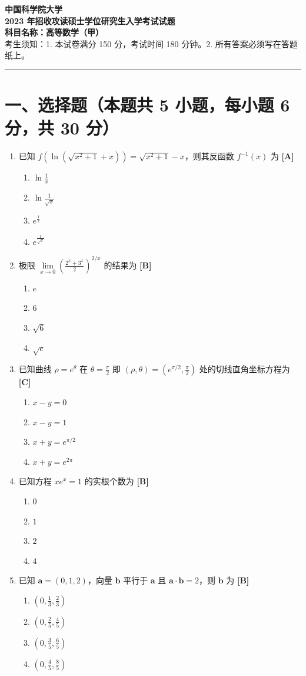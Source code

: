 \documentclass[a4paper,11pt]{article}
\newcommand{\xzanswer}[1]{\hfill\textbf{[#1]}}
\newcommand{\fourchoices}[4]{%
  \begin{enumerate}[label=\Alph*., itemsep=0pt, topsep=2pt]
    \item #1 \quad \item #2 \quad \item #3 \quad \item #4
  \end{enumerate}
}
\begin{document}
\begin{center}
  {\LARGE\bfseries 中国科学院大学}\\[4pt]
  {\Large\bfseries 2023 年招收攻读硕士学位研究生入学考试试题}\\[4pt]
  {\large\bfseries 科目名称：高等数学（甲）}\\[8pt]
  {\footnotesize 考生须知：1. 本试卷满分 150 分，考试时间 180 分钟。2. 所有答案必须写在答题纸上。}\\[-4pt]
  \rule{\textwidth}{0.8pt}
\end{center}

\vspace{10pt}

\section*{一、选择题（本题共 5 小题，每小题 6 分，共 30 分）}
\begin{enumerate}[label=\arabic*., leftmargin=1.5em]
  \item 已知 $f\left(\ln \left(\sqrt{x^2+1}+x\right)\right)=\sqrt{x^2+1}-x$，则其反函数 $f^{-1}(x)$ 为 \xzanswer{A}
  \fourchoices{$\ln \frac{1}{x}$}{$\ln \frac{1}{\sqrt{x}}$}{$e^{\frac{1}{x}}$}{$e^{\frac{1}{\sqrt{x}}}$}

  \item 极限 $\lim\limits_{x \to 0}\left(\frac{2^x+3^x}{2}\right)^{2/x}$ 的结果为 \xzanswer{B}
  \fourchoices{$e$}{$6$}{$\sqrt{6}$}{$\sqrt{e}$}

  \item 已知曲线 $\rho=e^\theta$ 在 $\theta=\frac{\pi}{2}$ 即 $(\rho, \theta)=\left(e^{\pi/2}, \frac{\pi}{2}\right)$ 处的切线直角坐标方程为 \xzanswer{C}
  \fourchoices{$x-y=0$}{$x-y=1$}{$x+y=e^{\pi/2}$}{$x+y=e^{2\pi}$}

  \item 已知方程 $xe^x=1$ 的实根个数为 \xzanswer{B}
  \fourchoices{$0$}{$1$}{$2$}{$4$}

  \item 已知 $\mathbf{a}=(0,1,2)$，向量 $\mathbf{b}$ 平行于 $\mathbf{a}$ 且 $\mathbf{a}\cdot\mathbf{b}=2$，则 $\mathbf{b}$ 为 \xzanswer{B}
  \fourchoices{$\left(0, \frac{1}{3}, \frac{2}{3}\right)$}{$\left(0, \frac{2}{5}, \frac{4}{5}\right)$}{$\left(0, \frac{3}{5}, \frac{6}{5}\right)$}{$\left(0, \frac{4}{5}, \frac{8}{5}\right)$}
\end{enumerate}
\end{document}
